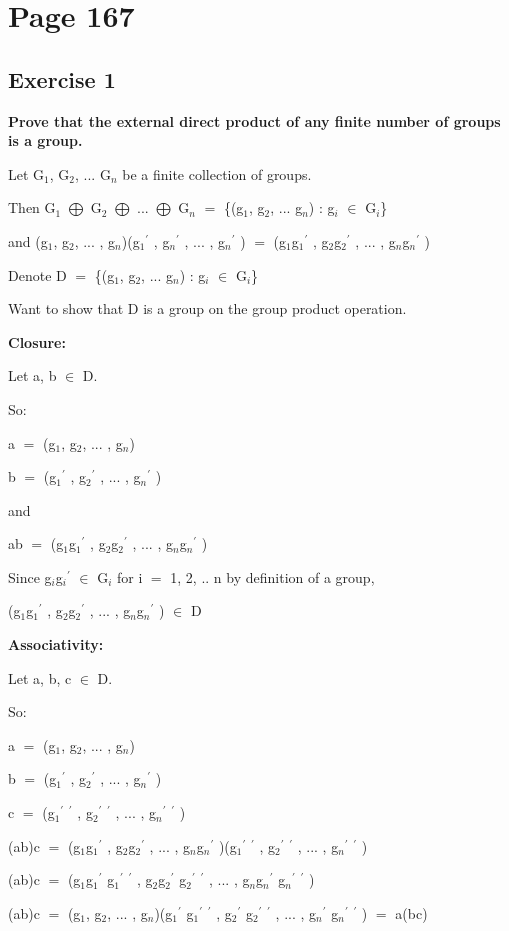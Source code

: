 \documentclass{article}
\newcommand{\mt}[1]{\ensuremath{#1}}
\newcommand\bsc[2][\DefaultOpt]{%
  \def\DefaultOpt{#2}%
  \section[#1]{#2}%
}
\newcommand\ssc[2][\DefaultOpt]{%
  \def\DefaultOpt{#2}%
  \subsection[#1]{#2}%
}
\newcommand{\mem}{\mt{\in} }
\newcommand{\bk}[1]{\{#1\}}
\newcommand{\eql}{\mt{=} }
\newcommand{\pr}{\mt{^\prime} } 		   %
\newcommand{\uw}[2]{#1\mt{_{#2}}}
\newcommand{\edp}{\mt{\bigoplus} }
\begin{document}
\bsc{Page 167}{
\ssc{Exercise 1}{
\textbf{Prove that the external direct product of any finite number of groups is a group.}

Let \uw{G}{1}, \uw{G}{2}, ... \uw{G}{n} be a finite collection of groups.

Then \uw{G}{1} \edp \uw{G}{2} \edp ... \edp \uw{G}{n} \eql \bk{(\uw{g}{1}, \uw{g}{2}, ... \uw{g}{n}) : \uw{g}{i} \mem \uw{G}{i}}

and (\uw{g}{1}, \uw{g}{2}, ... , \uw{g}{n})(\uw{g}{1}\pr, \uw{g}{n}\pr, ... , \uw{g}{n}\pr) \eql (\uw{g}{1}\uw{g}{1}\pr, \uw{g}{2}\uw{g}{2}\pr, ... , \uw{g}{n}\uw{g}{n}\pr)

Denote D \eql \bk{(\uw{g}{1}, \uw{g}{2}, ... \uw{g}{n}) : \uw{g}{i} \mem \uw{G}{i}}

Want to show that D is a group on the group product operation.

\textbf{Closure:}

Let a, b \mem D.

So:

a \eql (\uw{g}{1}, \uw{g}{2}, ... , \uw{g}{n})

b \eql (\uw{g}{1}\pr, \uw{g}{2}\pr, ... , \uw{g}{n}\pr)

and 

ab \eql (\uw{g}{1}\uw{g}{1}\pr, \uw{g}{2}\uw{g}{2}\pr, ... , \uw{g}{n}\uw{g}{n}\pr)

Since \uw{g}{i}\uw{g}{i}\pr \mem \uw{G}{i} for i \eql 1, 2, .. n by definition of a group,

(\uw{g}{1}\uw{g}{1}\pr, \uw{g}{2}\uw{g}{2}\pr, ... , \uw{g}{n}\uw{g}{n}\pr) \mem D

\textbf{Associativity:}

Let a, b, c \mem D.

So:

a \eql (\uw{g}{1}, \uw{g}{2}, ... , \uw{g}{n})

b \eql (\uw{g}{1}\pr, \uw{g}{2}\pr, ... , \uw{g}{n}\pr)

c \eql (\uw{g}{1}\pr\pr, \uw{g}{2}\pr\pr, ... , \uw{g}{n}\pr\pr)

(ab)c \eql (\uw{g}{1}\uw{g}{1}\pr, \uw{g}{2}\uw{g}{2}\pr, ... , \uw{g}{n}\uw{g}{n}\pr)(\uw{g}{1}\pr\pr, \uw{g}{2}\pr\pr, ... , \uw{g}{n}\pr\pr)

(ab)c \eql (\uw{g}{1}\uw{g}{1}\pr\uw{g}{1}\pr\pr, \uw{g}{2}\uw{g}{2}\pr\uw{g}{2}\pr\pr, ... , \uw{g}{n}\uw{g}{n}\pr\uw{g}{n}\pr\pr)

(ab)c \eql (\uw{g}{1}, \uw{g}{2}, ... , \uw{g}{n})(\uw{g}{1}\pr\uw{g}{1}\pr\pr, \uw{g}{2}\pr\uw{g}{2}\pr\pr, ... , \uw{g}{n}\pr\uw{g}{n}\pr\pr) \eql a(bc)

}}
\end{document}
